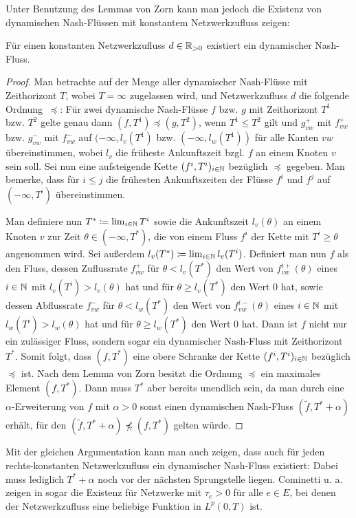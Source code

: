 Unter Benutzung des Lemmas von Zorn kann man jedoch die Existenz von dynamischen Nash-Flüssen mit konstantem Netzwerkzufluss zeigen:

\begin{theorem}
	Für einen konstanten Netzwerkzufluss $d\in\mathbb{R}_{> 0}$ existiert ein dynamischer Nash-Fluss.
\end{theorem}
\begin{proof}
	Man betrachte auf der Menge aller dynamischer Nash-Flüsse mit Zeithorizont $T$, wobei $T=\infty$ zugelassen wird, und Netzwerkzufluss $d$ die folgende Ordnung~$\preceq$:
	Für zwei dynamische Nash-Flüsse $f$ bzw. $g$ mit Zeithorizont $T^1$ bzw. $T^2$ gelte genau dann $(f, T^1)\preceq (g, T^2)$, wenn $T^1 \leq T^2$ gilt und $g^+_{vw}$ mit $f^+_{vw}$ bzw. $g^-_{vw}$ mit $f^-_{vw}$ auf $(-\infty, l_v(T^1)$ bzw. $(-\infty, l_w(T^1))$ für alle Kanten $vw$ übereinstimmen, wobei $l_v$ die früheste Ankunftszeit bzgl. $f$ an einem Knoten $v$ sein soll.
	Sei nun eine aufsteigende Kette $(f^i, T^i)_{i\in\mathbb{N}}$ bezüglich $\preceq$ gegeben.
	Man bemerke, dass für $i\leq j$ die frühesten Ankunftszeiten der Flüsse $f^i$ und $f^j$ auf $(-\infty, T^i)$ übereinstimmen.
	
	Man definiere nun $T^* \coloneq \lim_{i\in\mathbb{N}} T^i$ sowie die Ankunftszeit $l_v(\theta)$ an einem Knoten $v$ zur Zeit $\theta\in(-\infty, T^*)$, die von einem Fluss $f^i$ der Kette mit $T^i \geq \theta$ angenommen wird.
	Sei außerdem $l_v(T^*) \coloneq \lim_{i\in\mathbb{N}} l_v(T^i)$.
	Definiert man nun $f$ als den Fluss, dessen Zuflussrate $f_{vw}^+$ für $\theta<l_v(T^*)$ den Wert von $f^{i+}_{vw}(\theta)$ eines $i\in\mathbb{N}$ mit $l_v(T^i) > l_v(\theta)$ hat und für $\theta \geq l_v(T^*)$ den Wert $0$ hat, sowie dessen Abflussrate $f_{vw}^-$ für $\theta<l_w(T^*)$ den Wert von $f^{i-}_{vw}(\theta)$ eines $i\in\mathbb{N}$ mit $l_w(T^i) > l_w(\theta)$ hat und für $\theta \geq l_w(T^*)$ den Wert $0$ hat.
	Dann ist $f$ nicht nur ein zulässiger Fluss, sondern sogar ein dynamischer Nash-Fluss mit Zeithorizont $T^*$.
	Somit folgt, dass $(f, T^*)$ eine obere Schranke der Kette $(f^i, T^i)_{i\in\mathbb{N}}$ bezüglich $\preceq$ ist.
	Nach dem Lemma von Zorn besitzt die Ordnung $\preceq$ ein maximales Element $(f, T^*)$.
	Dann muss $T^*$ aber bereits unendlich sein, da man durch eine $\alpha$-Erweiterung von $f$ mit $\alpha > 0$ sonst einen dynamischen Nash-Fluss $(\tilde{f}, T^* + \alpha)$ erhält, für den $(\tilde{f}, T^* + \alpha) \npreceq (f, T^*)$ gelten würde.
\end{proof}

Mit der gleichen Argumentation kann man auch zeigen, dass auch für jeden rechts-konstanten Netzwerkzufluss ein dynamischer Nash-Fluss existiert:
Dabei muss lediglich $T^* + \alpha$ noch vor der nächsten Sprungstelle liegen.
Cominetti u. a. zeigen in \cite{Cominetti2015} sogar die Existenz für Netzwerke mit $\tau_e > 0$ für alle $e\in E$, bei denen der Netzwerkzufluss eine beliebige Funktion in $L^p(0,T)$ ist.